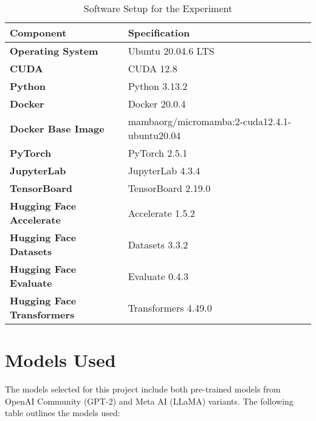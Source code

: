 \begin{table}[H]
  \centering
  \scriptsize
  \renewcommand{\arraystretch}{1.3}
  \begin{tabularx}{0.95\textwidth}{
    >{\raggedright\arraybackslash}p{5cm}
    >{\centering\arraybackslash}X
  }
    \toprule
    \textbf{Component} & \textbf{Specification} \\
    \midrule
    \textbf{Operating System} & Ubuntu 20.04.6 LTS \\
    \textbf{CUDA} & CUDA 12.8 \\
    \textbf{Python} & Python 3.13.2 \\
    \textbf{Docker} & Docker 20.0.4 \\
    \textbf{Docker Base Image} & mambaorg/micromamba:2-cuda12.4.1-ubuntu20.04 \\
    \textbf{PyTorch} & PyTorch 2.5.1 \\
    \textbf{JupyterLab} & JupyterLab 4.3.4 \\
    \textbf{TensorBoard} & TensorBoard 2.19.0 \\
    \textbf{Hugging Face Accelerate} & Accelerate 1.5.2 \\
    \textbf{Hugging Face Datasets} & Datasets 3.3.2 \\
    \textbf{Hugging Face Evaluate} & Evaluate 0.4.3 \\
    \textbf{Hugging Face Transformers} & Transformers 4.49.0 \\
    \bottomrule
  \end{tabularx}
  \caption{Software Setup for the Experiment}
\end{table}

\section*{Models Used}

The models selected for this project include both pre-trained models from OpenAI Community
(GPT-2) and Meta AI (LLaMA) variants. The following table outlines the models
used:

